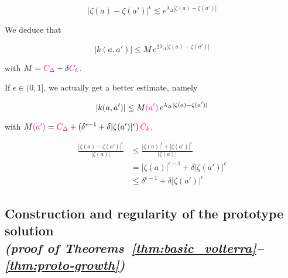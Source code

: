 \documentclass{article}
\theoremstyle{plain}
\newenvironment{verify}{\color{ForestGreen}}{\color{black}}
\begin{document}
\[|\zeta(a)-\zeta(a')|^\epsilon\lesssim e^{\lambda_\Delta |\zeta(a)-\zeta(a')|} \]

We deduce that 

\[ |k(a,a')| \leq M\, e^{2 \lambda_\Delta |\zeta(a)-\zeta(a')|} \]

with $M= \textcolor{magenta}{C_\Delta} + \delta \textcolor{magenta}{C_k}$. 

\color{purple}If $\epsilon\in (0,1]$, we actually get a better estimate, namely 

\[ |k(a,a')| \leq M\textcolor{magenta}{(a')}\, e^{ \lambda_\Delta |\zeta(a)-\zeta(a')|} \]

with $M\textcolor{magenta}{(a')} = \textcolor{magenta}{C_\Delta} + (\delta^{\epsilon-1}+\delta |\zeta(a')|^\epsilon ) \,  \textcolor{magenta}{C_k}$.\color{black}

\begin{verify}
    \begin{align*}
        \frac{|\zeta(a)-\zeta(a')|^\epsilon}{|\zeta(a)|} & \leq \frac{|\zeta(a)|^\epsilon + |\zeta(a')|^\epsilon}{|\zeta(a)|}\\
        &= |\zeta(a)|^{\epsilon-1}+ \delta |\zeta(a')|^\epsilon\\
        &\leq \delta^{\epsilon-1}+ \delta |\zeta(a')|^\epsilon 
    \end{align*}
\end{verify}




\subsection{Construction and regularity of the prototype solution \\ \textit{(proof of Theorems~\ref{thm:basic_volterra}--\ref{thm:proto-growth})}}\label{sec:proto-construction-regularity}
\end{document}
